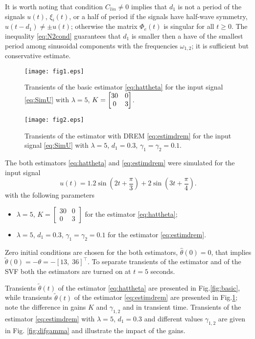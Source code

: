 \documentclass[journal, onecolumn]{IEEEtran}
\newcommand{\hth}{\hat{\theta}}
\newcommand{\tth}{\tilde{\theta}}
\begin{document}
It is worth noting that condition $C_{lin}\ne 0$ implies that $d_1$ is not a period of the signals $u(t)$, $\xi_i(t)$, or a half of period if the signals have half-wave symmetry, ${u(t-d_1)\ne \pm u(t)}$; otherwise the matrix $\Phi_e(t)$ is singular for all $t\ge0$. The inequality \eqref{eq:N2cond} guarantees that $d_1$ is smaller then a have of the smallest period among sinusoidal components with the frequencies $\omega_{1,2}$; it is sufficient but conservative estimate. 

\begin{figure}[t]
	\centering
	\texttt{[image: fig1.eps]}
	\caption{Transients of the basic estimator \eqref{eq:hattheta} for the input signal \eqref{eq:SimU} with $\lambda=5$, $K=\protect\begin{bmatrix} 30 & 0\\0&3\protect\end{bmatrix}$.}
	\label{fig:basic}
	\texttt{[image: fig2.eps]}
	\caption{Transients of the estimator with DREM \eqref{eq:estimdrem} for the input signal \eqref{eq:SimU} with $\lambda=5$, $d_1=0.3$, $\gamma_1=\gamma_2=0.1$.}
	\label{fig:drem}
\end{figure}

The both estimators \eqref{eq:hattheta} and \eqref{eq:estimdrem} were simulated for the input signal
\begin{equation}\label{eq:SimU}
	u(t) = 1.2 \sin(2t+\frac{\pi}{3}) + 2\sin(3t+\frac{\pi}{4}).
\end{equation}
with the following parameters
\begin{itemize}
\item $\lambda=5$, $K=\begin{bmatrix} 30 & 0 \\ 0 & 3 \end{bmatrix}$ for the estimator \eqref{eq:hattheta};
\item $\lambda=5$, $d_1=0.3$, $\gamma_1=\gamma_2=0.1$ for the estimator \eqref{eq:estimdrem}.
\end{itemize}
Zero initial conditions are chosen for the both estimators, $\hth(0)=0$, that implies $\tth(0)=-\theta=-[13, \; 36]^\top$. To separate transients of the estimator and of the SVF both the estimators are turned on at $t=5$ seconds.

Transients $\tth(t)$ of the estimator \eqref{eq:hattheta} are presented in Fig.\ref{fig:basic}, while transients $\tth(t)$ of the estimator \eqref{eq:estimdrem} are presented in Fig.\ref{fig:drem}; note the difference in gains $K$ and $\gamma_{1,2}$ and in transient time. Transients of the estimator \eqref{eq:estimdrem} with $\lambda=5$, $d_1=0.3$ and different values $\gamma_{1,2}$ are given in Fig. \ref{fig:difgamma} and illustrate the impact of the gains.
\end{document}
